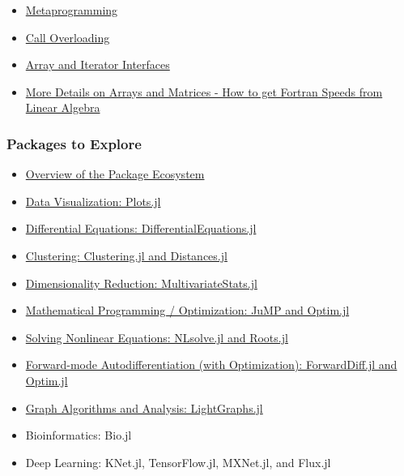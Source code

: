 \documentclass[11pt]{article}
\providecommand{\tightlist}{%
      \setlength{\itemsep}{0pt}\setlength{\parskip}{0pt}}
\begin{document}
\begin{itemize}
\tightlist
\item
  \href{http://ucidatascienceinitiative.github.io/IntroToJulia/Slides/Metaprogramming}{Metaprogramming}
\item
  \href{http://ucidatascienceinitiative.github.io/IntroToJulia/Slides/CallOverloading}{Call
  Overloading}
\item
  \href{http://ucidatascienceinitiative.github.io/IntroToJulia/Slides/ArrayIteratorInterfaces}{Array
  and Iterator Interfaces}
\item
  \href{http://ucidatascienceinitiative.github.io/IntroToJulia/Slides/ArraysAndMatrices}{More
  Details on Arrays and Matrices - How to get Fortran Speeds from Linear
  Algebra}
\end{itemize}

\subsubsection{Packages to Explore}\label{packages-to-explore}

\begin{itemize}
\tightlist
\item
  \href{http://ucidatascienceinitiative.github.io/IntroToJulia/Slides/PackageEcosystem}{Overview
  of the Package Ecosystem}
\item
  \href{http://ucidatascienceinitiative.github.io/IntroToJulia/Slides/PlotsJL}{Data
  Visualization: Plots.jl}
\item
  \href{http://ucidatascienceinitiative.github.io/IntroToJulia/Slides/DiffEq}{Differential
  Equations: DifferentialEquations.jl}
\item
  \href{http://ucidatascienceinitiative.github.io/IntroToJulia/Html/Clustering}{Clustering:
  Clustering.jl and Distances.jl}
\item
  \href{http://ucidatascienceinitiative.github.io/IntroToJulia/Html/DimensionalityReduction}{Dimensionality
  Reduction: MultivariateStats.jl}
\item
  \href{http://ucidatascienceinitiative.github.io/IntroToJulia/Slides/Optimization}{Mathematical
  Programming / Optimization: JuMP and Optim.jl}
\item
  \href{http://ucidatascienceinitiative.github.io/IntroToJulia/Slides/NonlinearSolve}{Solving
  Nonlinear Equations: NLsolve.jl and Roots.jl}
\item
  \href{http://ucidatascienceinitiative.github.io/IntroToJulia/Slides/ForwardDiff}{Forward-mode
  Autodifferentiation (with Optimization): ForwardDiff.jl and Optim.jl}
\item
  \href{http://ucidatascienceinitiative.github.io/IntroToJulia/Slides/Graphs}{Graph
  Algorithms and Analysis: LightGraphs.jl}
\item
  Bioinformatics: Bio.jl
\item
  Deep Learning: KNet.jl, TensorFlow.jl, MXNet.jl, and Flux.jl
\end{itemize}
\end{document}
